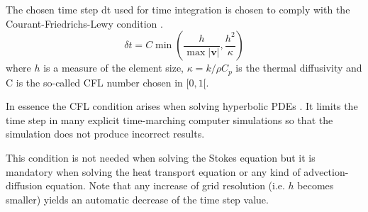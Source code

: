 The chosen time step dt used for time integration is chosen to
comply with the Courant-Friedrichs-Lewy condition \cite{cfd_anderson}.
\begin{equation}
\delta t = C \min \left( \frac{h}{\max |{\bm v}|} , \frac{h^2}{\kappa}  \right)
\end{equation}
where $h$ is a measure of the element size, $\kappa = k/ \rho C_p$ 
is the thermal diffusivity and C is the so-called CFL number chosen in $[0,1[$.

In essence the CFL condition arises when solving hyperbolic PDEs .
It limits the time step in many explicit time-marching computer simulations
so that the simulation does not produce incorrect results. 

This condition is not needed when solving the Stokes equation but it is mandatory 
when solving the heat transport equation or any kind of advection-diffusion equation. 
Note that any increase of grid resolution (i.e. $h$ becomes smaller) yields an automatic 
decrease of the time step value.







